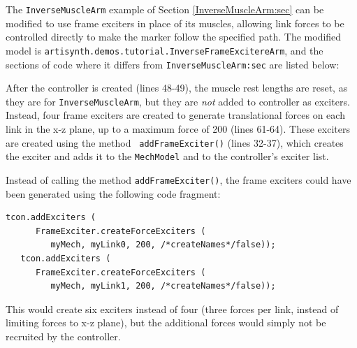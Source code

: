 The {\tt InverseMuscleArm} example of Section
\ref{InverseMuscleArm:sec} can be modified to use
frame exciters in place of its muscles, allowing link forces
to be controlled directly to make the marker follow
the specified path. The modified model is
{\tt artisynth.demos.tutorial.InverseFrameExcitereArm},
and the sections of code where it differs
from {\tt InverseMuscleArm:sec} are listed below:
%
\lstset{numbers=left}
\iflatexml

\else
{}

\fi
\lstset{numbers=none}
%
%
\lstset{numbers=left}
\iflatexml

\else
{}

\fi
\lstset{numbers=none}
%
After the controller is created (lines 48-49), the muscle rest lengths are
reset, as they are for {\tt InverseMuscleArm}, but they are {\it not} added to
controller as exciters. Instead, four frame exciters are created to generate
translational forces on each link in the x-z plane, up to a maximum force of
200 (lines 61-64). These exciters are created using the method {\tt
addFrameExciter()} (lines 32-37), which creates the exciter and adds it to the
{\tt MechModel} and to the controller's exciter list.

\iflatexml\else\clearpage\fi

Instead of calling the method {\tt addFrameExciter()}, the frame exciters could have been generated using the following code fragment:
%
\begin{lstlisting}[]
   tcon.addExciters (
      FrameExciter.createForceExciters (
         myMech, myLink0, 200, /*createNames*/false));
   tcon.addExciters (
      FrameExciter.createForceExciters (
         myMech, myLink1, 200, /*createNames*/false));
\end{lstlisting}
%
This would create six exciters instead of four (three forces per link, instead
of limiting forces to x-z plane), but the additional forces would simply not be
recruited by the controller.

